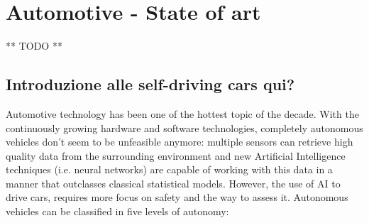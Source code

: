 \chapter{Automotive - State of art}


** TODO **


\section{Introduzione alle self-driving cars qui?}


Automotive technology has been one of the hottest topic of the decade.\newline 
With the continuously growing hardware and software technologies, completely autonomous vehicles don't seem to be unfeasible anymore: multiple sensors can retrieve high quality data from the surrounding environment and new Artificial Intelligence techniques (i.e. neural networks) are capable of working with this data in a manner that outclasses classical statistical models. However, the use of AI to drive cars, requires more focus on safety and the way to assess it.\newline
Autonomous vehicles can be classified in five levels of autonomy:

